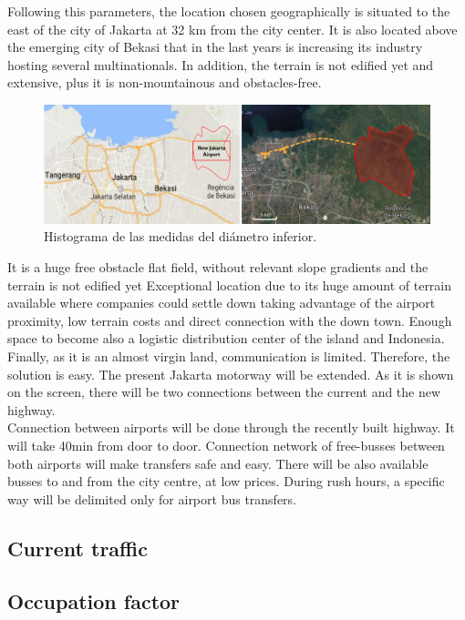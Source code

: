 Following this parameters, the location chosen geographically is situated to the east of the city of Jakarta at 32 km from the city center. It is also located above the emerging city of Bekasi that in the last years is increasing its industry hosting several multinationals. In addition, the terrain is not edified yet and extensive, plus it is non-mountainous and obstacles-free.

\begin{figure}[H]
	\centering
	\includegraphics[clip, trim=0cm 0cm 0cm 0cm, width=1.00\textwidth]{./images/PROGNOSIS/airport_location}
	\caption{Histograma de las medidas del diámetro inferior.}
	\label{hist_inf}
\end{figure}

It is a huge free obstacle flat field, without relevant slope gradients and the terrain is not edified yet Exceptional location due to its huge amount of terrain available where companies could settle down taking advantage of the airport proximity, low terrain costs and direct connection with the down town. Enough space to become also a logistic distribution center of the island and Indonesia.\\

Finally, as it is an almost virgin land, communication is limited. Therefore, the solution is easy. The present Jakarta motorway will be extended. As it is shown on the screen, there will be two connections between the current and the new highway. \\

Connection between airports will be done through the recently built highway. It will take 40min from door to door. Connection network of free-busses between both airports will make transfers safe and easy. There will be also available busses to and from the city centre, at low prices. During rush hours, a specific way will be delimited only for airport bus transfers. 


	
	\subsection{Current traffic}
	\subsection{Occupation factor}